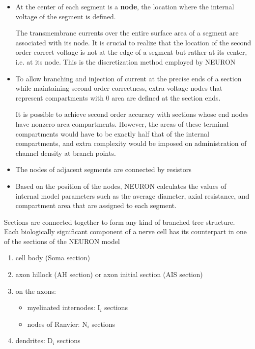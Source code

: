 \begin{itemize}
  \item At the center of each segment is a {\bf node}, the location where the
  internal voltage of the segment is defined.

The transmembrane currents over the entire surface area of a segment are
associated with its node. It is crucial to realize that the location of the
second order correct voltage is not at the edge of a segment but rather at its
center, i.e. at its node. This is the discretization method employed by NEURON

  \item To allow branching and injection of current at the precise ends of a
  section while maintaining second order correctness, extra voltage nodes that
  represent compartments with 0 area are defined at the section ends.

It is possible to achieve second order accuracy with sections whose end nodes
have nonzero area compartments. However, the areas of these terminal
compartments would have to be exactly half that of the internal compartments,
and extra complexity would be imposed on administration of channel density at
branch points.
  
  \item The nodes of adjacent segments are connected by resistors

  \item Based on the position of the nodes, NEURON calculates the values of internal
model parameters such as the average diameter, axial resistance, and compartment
area that are assigned to each segment.
    
\end{itemize}


Sections are connected together to form any kind of branched tree structure.
Each biologically significant component of a nerve cell has its counterpart in
one of the sections of the NEURON model
\begin{enumerate}
  \item cell body (Soma section)
  \item axon hillock (AH section) or axon initial section (AIS section)
  \item on the axons: 
  \begin{itemize}
    \item myelinated internodes: I$_i$ sections
    \item nodes of Ranvier: N$_i$ sections
  \end{itemize}
  
  \item dendrites: D$_i$ sections
\end{enumerate}



